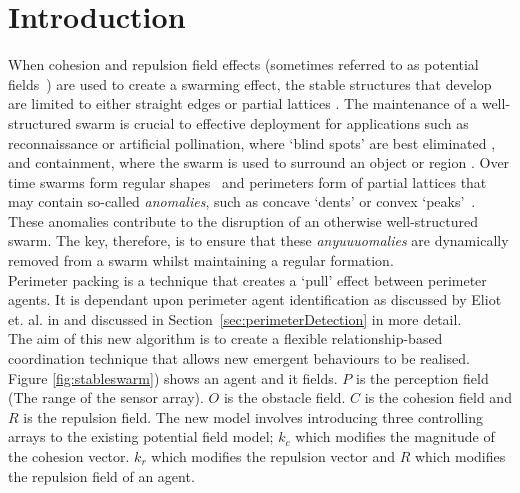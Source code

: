 \documentclass[12pt,a4paper]{IEEEtran}
\newcommand{\kc}{\mathit{k_c}}
\newcommand{\kr}{\mathit{k_r}}
\newcommand{\rb}{\mathit{R}}
\begin{document}
\section{Introduction}
When cohesion and repulsion field effects (sometimes referred to as potential fields~\cite{BAF:06,eliot2018metric,VG:05,SW:03,Son2017,liang2019swarm}) are used to create a swarming effect, the stable structures that develop are limited to either straight edges or partial lattices \cite{eliot2017methods}. The maintenance of a well-structured swarm is crucial to effective deployment for applications such as reconnaissance or artificial pollination, where `blind spots' are best eliminated \cite{elamvazhuthi2015optimal}, and containment, where the swarm is used to surround an object or region \cite{cao2012distributed}. Over time swarms form regular shapes~\cite{RAZ:13} and perimeters form of partial lattices that may contain so-called \textit{anomalies}, such as concave `dents' or convex `peaks'~\cite{eliot2019void}. These anomalies contribute to the disruption of an otherwise well-structured swarm. The key, therefore, is to ensure that these \textit{anyuuuomalies} are dynamically removed from a swarm whilst maintaining a regular formation.\\
Perimeter packing is a technique that creates a `pull' effect between perimeter agents. It is dependant upon perimeter agent identification as discussed by Eliot et. al. in \cite{eliot2017methods, eliot2018metric, eliot2019void} and discussed in Section~\ref{sec:perimeterDetection} in more detail.\\
The aim of this new algorithm is to create a flexible relationship-based coordination technique that allows new emergent behaviours to be realised. Figure \ref{fig:stableswarm}) shows an agent and it fields. $P$ is the perception field (The range of the sensor array). $O$ is the obstacle field. $C$ is the cohesion field and $\rb$ is the repulsion field. The new model involves introducing three controlling arrays to the existing potential field model; $\kc$ which modifies the magnitude of the cohesion vector. $\kr$ which modifies the repulsion vector and $\rb$ which modifies the repulsion field of an agent.\\
\end{document}
